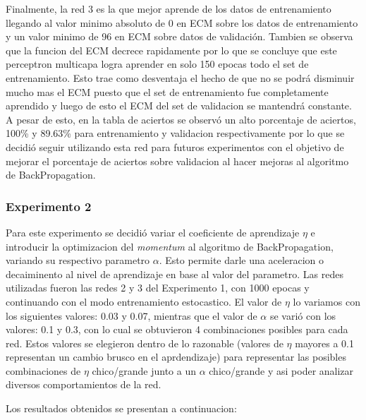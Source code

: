  Finalmente, la red 3 es la que mejor aprende de los datos de entrenamiento llegando al valor minimo absoluto de 0 en ECM sobre los datos de entrenamiento y un valor minimo
 de 96 en ECM sobre datos de validación. Tambien se observa que la funcion del ECM decrece rapidamente por lo que se concluye que este perceptron multicapa
 logra aprender en solo 150 epocas todo el set de entrenamiento. Esto trae como desventaja el hecho de que no se podrá disminuir mucho mas el ECM puesto que el set
 de entrenamiento fue completamente aprendido y luego de esto el ECM del set de validacion se mantendrá constante.
 A pesar de esto, en la tabla de aciertos se observó un alto
 porcentaje de aciertos, 100\% y 89.63\% para entrenamiento y validacion respectivamente por lo que se decidió seguir utilizando esta red para futuros experimentos
 con el objetivo de mejorar el porcentaje de aciertos sobre validacion al hacer mejoras al algoritmo de BackPropagation.

\subsubsection{Experimento 2}
Para este experimento se decidió variar el coeficiente de aprendizaje $\eta$ e introducir la optimizacion del \textit{momentum} al algoritmo de BackPropagation,
variando su respectivo parametro $\alpha$. Esto permite darle una aceleracion o decaiminento al nivel de aprendizaje en base al valor del parametro.
Las redes utilizadas fueron las redes 2 y 3 del Experimento 1, con 1000 epocas y continuando con el modo entrenamiento estocastico.
El valor de $\eta$ lo variamos con los siguientes valores: 0.03 y 0.07, mientras que el valor de $\alpha$ se varió con los valores: 0.1 y 0.3,
con lo cual se obtuvieron 4 combinaciones posibles para cada red. Estos valores se elegieron dentro de lo razonable (valores de $\eta$ mayores a 0.1
representan un cambio brusco en el aprdendizaje) para representar las posibles combinaciones de $\eta$ chico/grande junto a un $\alpha$ chico/grande y
 asi poder analizar diversos comportamientos de la red.

 Los resultados obtenidos se presentan a continuacion:

